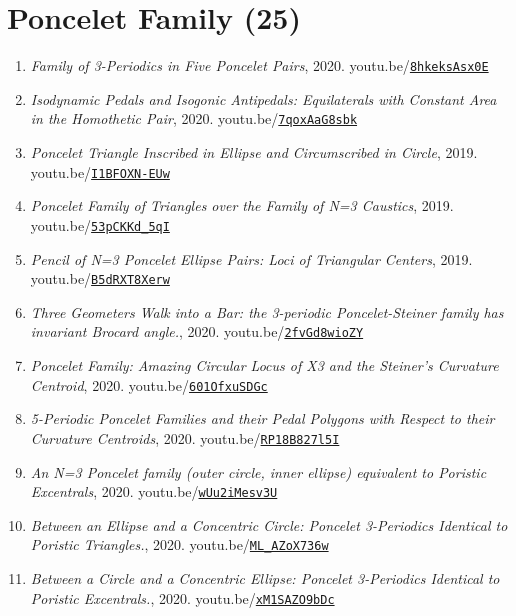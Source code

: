 \documentclass[12pt]{article}
\begin{document}
\section{Poncelet Family (25)}

\begin{enumerate}[resume]
\item \textit{Family of 3-Periodics in Five Poncelet Pairs}, 2020. youtu.be/\href{https://youtu.be/8hkeksAsx0E}{\nolinkurl{8hkeksAsx0E}}
\item \textit{Isodynamic Pedals and Isogonic Antipedals: Equilaterals with Constant Area in the Homothetic Pair}, 2020. youtu.be/\href{https://youtu.be/7qoxAaG8sbk}{\nolinkurl{7qoxAaG8sbk}}
\item \textit{Poncelet Triangle Inscribed in Ellipse and Circumscribed in Circle}, 2019. youtu.be/\href{https://youtu.be/I1BFOXN-EUw}{\nolinkurl{I1BFOXN-EUw}}
\item \textit{Poncelet Family of Triangles over the Family of N=3 Caustics}, 2019. youtu.be/\href{https://youtu.be/53pCKKd_5qI}{\nolinkurl{53pCKKd\_5qI}}
\item \textit{Pencil of N=3 Poncelet Ellipse Pairs: Loci of Triangular Centers}, 2019. youtu.be/\href{https://youtu.be/B5dRXT8Xerw}{\nolinkurl{B5dRXT8Xerw}}
\item \textit{Three Geometers Walk into a Bar: the 3-periodic Poncelet-Steiner family has invariant Brocard angle.}, 2020. youtu.be/\href{https://youtu.be/2fvGd8wioZY}{\nolinkurl{2fvGd8wioZY}}
\item \textit{Poncelet Family: Amazing Circular Locus of X3 and the Steiner's Curvature Centroid}, 2020. youtu.be/\href{https://youtu.be/601OfxuSDGc}{\nolinkurl{601OfxuSDGc}}
\item \textit{5-Periodic Poncelet Families and their Pedal Polygons with Respect to their Curvature Centroids}, 2020. youtu.be/\href{https://youtu.be/RP18B827l5I}{\nolinkurl{RP18B827l5I}}
\item \textit{An N=3 Poncelet family (outer circle, inner ellipse) equivalent to Poristic Excentrals}, 2020. youtu.be/\href{https://youtu.be/wUu2iMesv3U}{\nolinkurl{wUu2iMesv3U}}
\item \textit{Between an Ellipse and a Concentric Circle: Poncelet 3-Periodics Identical to Poristic Triangles.}, 2020. youtu.be/\href{https://youtu.be/ML_AZoX736w}{\nolinkurl{ML\_AZoX736w}}
\item \textit{Between a Circle and a Concentric Ellipse: Poncelet 3-Periodics Identical to Poristic Excentrals.}, 2020. youtu.be/\href{https://youtu.be/xM1SAZO9bDc}{\nolinkurl{xM1SAZO9bDc}}

\end{enumerate}
\end{document}
